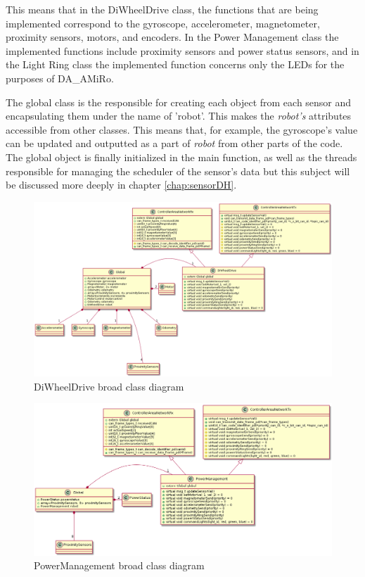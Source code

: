 \documentclass[12pt]{report}%
\begin{document}
This means that in the DiWheelDrive class, the functions that are being implemented correspond to the gyroscope, accelerometer, magnetometer, proximity sensors, motors, and encoders. In the Power Management class the implemented functions include proximity sensors and power status sensors, and in the Light Ring class the implemented function concerns only the LEDs for the purposes of DA\_AMiRo.

The global class is the responsible for creating each object from each sensor and encapsulating them under the name of 'robot'. This makes the \textit{robot's} attributes accessible from other classes. This means that, for example, the gyroscope's value can be updated and outputted as a part of \textit{robot} from other parts of the code. The global object is finally initialized in the main function, as well as the threads responsible for managing the scheduler of the sensor's data but this subject will be discussed more deeply in chapter \ref{chap:sensorDH}.

\begin{figure}[ht]
	\centering
	\includegraphics[width=\textwidth]{DWDclass}
    \caption{DiWheelDrive broad class diagram}
    \label{fig:DWDclass}
\end{figure}

\begin{figure}[ht]
	\centering
	\includegraphics[width=\textwidth]{PMclass}
    \caption{PowerManagement broad class diagram}
    \label{fig:PMclass}
\end{figure}
\end{document}
